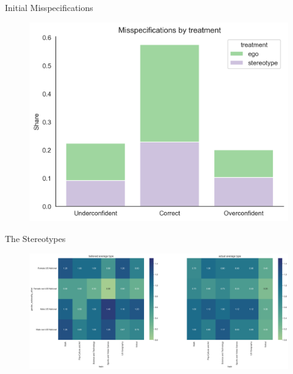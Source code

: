 \documentclass[aspectratio=169]{beamer}
\begin{document}
\begin{frame}{Initial Misspecifications}
    \label{initialhist}
    \begin{figure}
        \centering
        \includegraphics[scale=.5]{misspecification_hist.png}
    \end{figure}

\end{frame}

\begin{frame}{The Stereotypes}
    \label{typeheat}
    \begin{figure}
        \centering
        \includegraphics[scale=.3]{believed_actual_type_heat.png}
    \end{figure}


\end{frame}
\end{document}
